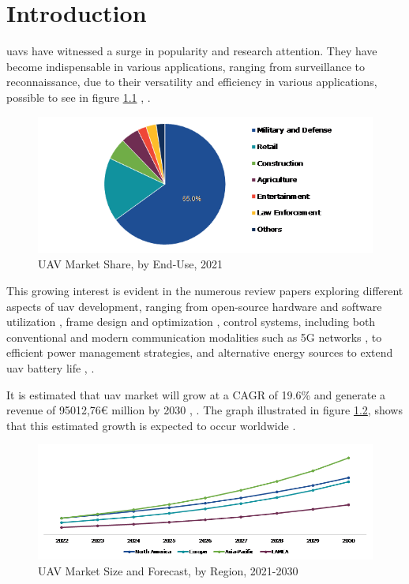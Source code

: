 \chapter{Introduction}
\label{chap:Chapter1}

\glspl{uav} have witnessed a surge in popularity and research attention.
They have become indispensable in various applications, ranging from surveillance to reconnaissance, due to their versatility and efficiency in various applications, possible to see in figure \ref{fig:uav_market1} \cite{UAV1}, \cite{UAV_market}.

\begin{figure}[H]
    \centering
    \includegraphics[scale=1]{ch1/assests/uav_market1.png}
    \caption{UAV Market Share, by End-Use, 2021\cite{UAV_market}}
    \label{fig:uav_market1}
\end{figure}

This growing interest is evident in the numerous review papers exploring different aspects of \gls{uav} development, ranging from open-source hardware and software utilization \cite{UAV2}, frame design and optimization \cite{UAV5}, control systems, including both conventional and modern communication modalities such as 5G networks \cite{UAV7}, to efficient power management strategies, and alternative energy sources to extend \gls{uav} battery life \cite{UAV12}, \cite{UAV_market}. %

It is estimated that \gls{uav} market will grow at a \gls{CAGR} of 19.6\% and generate a revenue of 95012,76€ million by 2030 \cite{UAV_market}, \cite{UAV_market2}.
The graph illustrated in figure \ref{fig:uav_market2}, shows that this estimated growth is expected to occur worldwide \cite{UAV_market}.

\begin{figure}[H]
    \centering
    \includegraphics[scale=0.7]{ch1/assests/uav_market2.png}
    \caption{UAV Market Size and Forecast, by Region, 2021-2030 \cite{UAV_market}}
    \label{fig:uav_market2}
\end{figure}

